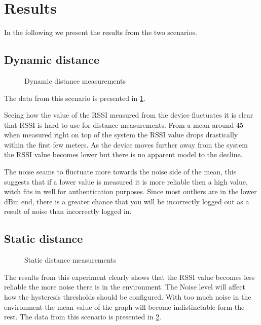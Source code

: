 \section{Results}
\label{sec_results}

In the following we present the results from the two scenarios.

\subsection{Dynamic distance}

\begin{figure}		
	
	
	
	\caption{ Dynamic distance measurements }
	\label{graf_DynamicMesurements}
	
\end{figure}

The data from this scenario is presented in \cref{graf_DynamicMesurements}.

Seeing how the value of the RSSI measured from the device fluctuates it is clear that RSSI is hard to use for distance measurements.
From a mean around 45 when measured right on top of the system the RSSI value drops drastically within the first few meters.
As the device moves further away from the system the RSSI value becomes lower but there is no apparent model to the decline.

The noise seams to fluctuate more towards the noise side of the mean, this suggests that if a lower value is measured it is more reliable then a high value, witch fits in well for authentication purposes.
Since most outliers are in the lower dBm end, there is a greater chance that you will be incorrectly logged out as a result of noise than incorrectly logged in.


\subsection{Static distance}
\begin{figure}
	
	
	\caption{Static distance measurements}
	\label{graf_StaticMesurements}
\end{figure}

The results from this experiment clearly shows that the RSSI value becomes less reliable the more noise there is in the environment.
The Noise level will affect how the hysteresis thresholds should be configured.
With too much noise in the environment the mean value of the graph will become indistinctable form the rest.
The data from this scenario is presented in \cref{graf_StaticMesurements}. 



